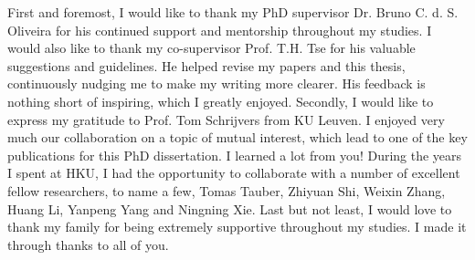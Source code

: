 
First and foremost, I would like to thank my PhD supervisor Dr. Bruno C. d. S.
Oliveira for his continued support and mentorship throughout my studies. I would
also like to thank my co-supervisor Prof. T.H. Tse for his valuable suggestions
and guidelines. He helped revise my papers and this thesis, continuously nudging
me to make my writing more clearer. His feedback is nothing short of inspiring,
which I greatly enjoyed. Secondly, I would like to express my gratitude to Prof.
Tom Schrijvers from KU Leuven. I enjoyed very much our collaboration on a topic
of mutual interest, which lead to one of the key publications for this PhD
dissertation. I learned a lot from you! During the years I spent at HKU, I had
the opportunity to collaborate with a number of excellent fellow researchers, to
name a few, Tomas Tauber, Zhiyuan Shi, Weixin Zhang, Huang Li, Yanpeng Yang and
Ningning Xie. Last but not least, I would love to thank my family for being
extremely supportive throughout my studies. I made it through thanks to all of
you.